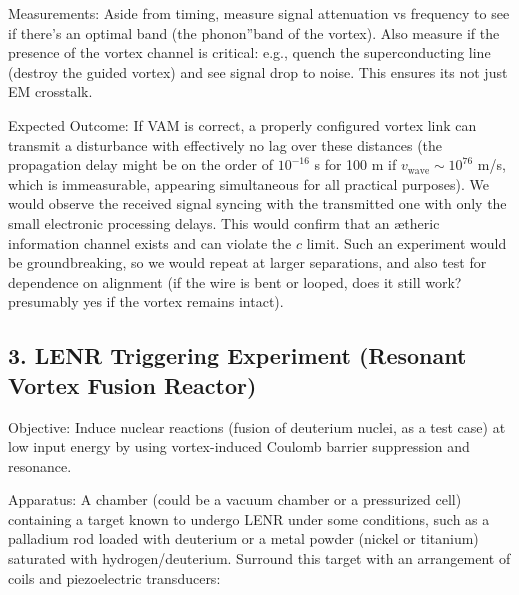 Measurements: Aside from timing, measure signal attenuation vs frequency to see if there's an optimal band (the \grqq phonon\textquotedblright band of the vortex). Also measure if the presence of the vortex channel is critical: e.g., quench the superconducting line (destroy the guided vortex) and see signal drop to noise. This ensures it\rqs s not just EM crosstalk.


Expected Outcome: If VAM is correct, a properly configured vortex link can transmit a disturbance with effectively no lag over these distances (the propagation delay might be on the order of $10^{-16}$ s for 100 m if $v_\text{wave}\sim10^{76}$ m/s, which is immeasurable, appearing simultaneous for all practical purposes). We would observe the received signal syncing with the transmitted one with only the small electronic processing delays. This would confirm that an ætheric information channel exists and can violate the $c$ limit. Such an experiment would be groundbreaking, so we would repeat at larger separations, and also test for dependence on alignment (if the wire is bent or looped, does it still work? presumably yes if the vortex remains intact).


\subsection*{3. LENR Triggering Experiment (Resonant Vortex Fusion Reactor)}

Objective: Induce nuclear reactions (fusion of deuterium nuclei, as a test case) at low input energy by using vortex-induced Coulomb barrier suppression and resonance.


Apparatus: A chamber (could be a vacuum chamber or a pressurized cell) containing a target known to undergo LENR under some conditions, such as a palladium rod loaded with deuterium or a metal powder (nickel or titanium) saturated with hydrogen/deuterium. Surround this target with an arrangement of coils and piezoelectric transducers:


